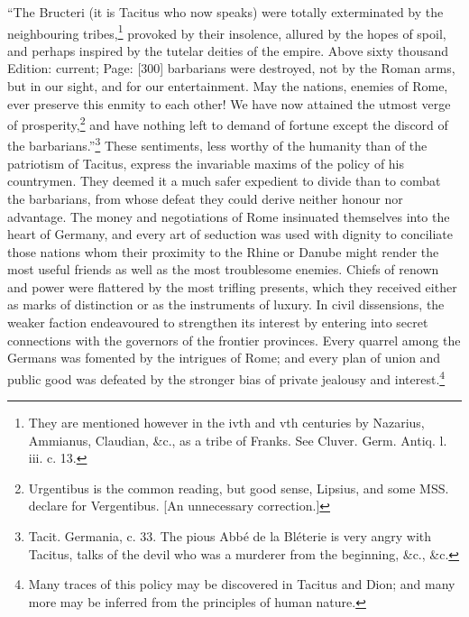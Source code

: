 \texthebrew{“}The Bructeri (it is Tacitus who now speaks) were totally exterminated by the neighbouring tribes,\footnote{They are mentioned however in the ivth and vth centuries by Nazarius, Ammianus, Claudian, \&c., as a tribe of Franks. See Cluver. Germ. Antiq. l. iii. c. 13.} provoked by their insolence, allured by the hopes of spoil, and perhaps inspired by the tutelar deities of the empire. Above sixty thousand Edition: current; Page: [300] barbarians were destroyed, not by the Roman arms, but in our sight, and for our entertainment. May the nations, enemies of Rome, ever preserve this enmity to each other! We have now attained the utmost verge of prosperity,\footnote{Urgentibus is the common reading, but good sense, Lipsius, and some MSS. declare for Vergentibus. [An unnecessary correction.]} and have nothing left to demand of fortune except the discord of the barbarians.\texthebrew{}”\footnote{Tacit. Germania, c. 33. The pious Abbé de la Bléterie is very angry with Tacitus, talks of the devil who was a murderer from the beginning, \&c., \&c.} These sentiments, less worthy of the humanity than of the patriotism of Tacitus, express the invariable maxims of the policy of his countrymen. They deemed it a much safer expedient to divide than to combat the barbarians, from whose defeat they could derive neither honour nor advantage. The money and negotiations of Rome insinuated themselves into the heart of Germany, and every art of seduction was used with dignity to conciliate those nations whom their proximity to the Rhine or Danube might render the most useful friends as well as the most troublesome enemies. Chiefs of renown and power were flattered by the most trifling presents, which they received either as marks of distinction or as the instruments of luxury. In civil dissensions, the weaker faction endeavoured to strengthen its interest by entering into secret connections with the governors of the frontier provinces. Every quarrel among the Germans was fomented by the intrigues of Rome; and every plan of union and public good was defeated by the stronger bias of private jealousy and interest.\footnote{Many traces of this policy may be discovered in Tacitus and Dion; and many more may be inferred from the principles of human nature.}

